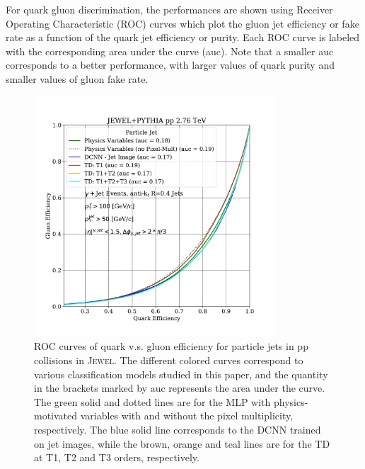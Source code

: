 \documentclass[notoc,preprintnumbers]{JHEP3}
\begin{document}
For quark gluon discrimination, the performances are shown using Receiver Operating Characteristic (ROC) curves which plot the gluon jet efficiency or fake rate as a function of the quark jet efficiency or purity. Each ROC curve is labeled with the corresponding area under the curve (auc). Note that a smaller auc corresponds to a better performance, with larger values of quark purity and smaller values of gluon fake rate.

\begin{figure}[h]
	\centering
	\includegraphics[width=0.8\textwidth]{Fig13}
	\caption{ROC curves of quark v.s. gluon efficiency for particle jets in pp collisions in \textsc{Jewel}. The different colored curves correspond to various classification models studied in this paper, and the quantity in the brackets marked by auc represents the area under the curve. The green solid and dotted lines are for the MLP with physics-motivated variables with and without the pixel multiplicity, respectively. The blue solid line corresponds to the DCNN trained on jet images, while the brown, orange and teal lines are for the TD at T1, T2 and T3 orders, respectively.}
\label{fig:ROC_pp}
\end{figure}
\end{document}
